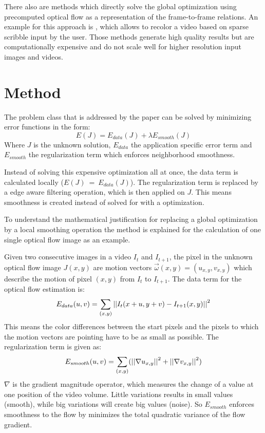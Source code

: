 \documentclass{utue} %
\begin{document}
There also are methods which directly solve the global optimization using
precomputed optical flow as a representation of the frame-to-frame relations. An
example for this approach is \cite{Levin:2004:CUO:1015706.1015780}, which allows
to recolor a video based on sparse scribble input by the user. Those methods
generate high quality results but are computationally expensive and do not scale
well for higher resolution input images and videos.

\section{Method} \label{method} The problem class that is addressed by the paper
can be solved by minimizing error functions in the form:
\begin{equation}
  E(J) = E_{data}(J) + \lambda E_{smooth}(J)
  \label{eq:error-function}
\end{equation}
Where $J$ is the unknown solution, $E_{data}$ the application specific error
term and $E_{smooth}$ the regularization term which enforces neighborhood
smoothness.

Instead of solving this expensive optimization all at once, the data term is
calculated locally ($E(J)~=~E_{data}(J)$). The regularization term is replaced
by a edge aware filtering operation, which is then applied on $J$. This means
smoothness is created instead of solved for with a optimization.

To understand the mathematical justification for replacing a global optimization
by a local smoothing operation the method is explained for the calculation of
one single optical flow image as an example.

Given two consecutive images in a video $I_t$ and $I_{t+1}$, the pixel in the
unknown optical flow image $J(x,y)$ are motion vectors $\vec{\omega}(x,y) =
(u_{x,y}, v_{x,y})$ which describe the motion of pixel $(x,y)$ from $I_t$ to
$I_{t+1}$. The data term for the optical flow estimation is:
\begin{equation}
  E_{data}(u, v) = \sum_{(x, y)}\left|\left| I_t(x+ u, y + v) - I_{t+1}(x, y) \right|\right|^{2}
  \label{eq:optical-flow-data}
\end{equation}
This means the color differences between the start pixels and the pixels to
which the motion vectors are pointing have to be as small as possible. The
regularization term is given as:
\begin{equation}
  E_{smooth}(u, v) = \sum_{(x,y)}(\left|\left| \nabla u_{x,y} \right|\right|^2 + \left|\left| \nabla
    v_{x,y} \right|\right|^2)
  \label{eq:optical-flow-smooth}
\end{equation}
$\nabla$ is the gradient magnitude operator, which measures
the change of a value at one position of the video volume. Little variations
results in small values (smooth), while big variations will create big values
(noise). So $E_{smooth}$ enforces smoothness to the flow by minimizes the total
quadratic variance of the flow gradient. 
\end{document}
